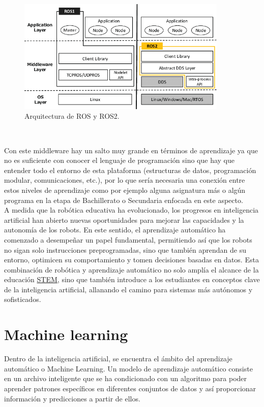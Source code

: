 \begin{figure} [h!]
  \begin{center}
    \includegraphics[width=10cm]{figs/ros.png}
  \end{center}
  \caption{Arquitectura de ROS y ROS2.}
  \label{fig:ros}
\end{figure}\

Con este middleware hay un salto muy grande en términos de aprendizaje ya que no es suficiente con conocer el lenguaje de programación sino que hay que entender todo el entorno de esta plataforma (estructuras de datos, programación modular, comunicaciones, etc.), por lo que sería necesaria una conexión entre estos niveles de aprendizaje como por ejemplo alguna asignatura más o algún programa en la etapa de Bachillerato o Secundaria enfocada en este aspecto.\\

A medida que la robótica educativa ha evolucionado, los progresos en inteligencia artificial han abierto nuevas oportunidades para mejorar las capacidades y la autonomía de los robots. En este sentido, el aprendizaje automático ha comenzado a desempeñar un papel fundamental, permitiendo así que los robots no sigan solo instrucciones preprogramadas, sino que también aprendan de su entorno, optimicen su comportamiento y tomen decisiones basadas en datos. Esta combinación de robótica y aprendizaje automático no solo amplía el alcance de la educación \hyperlink{STEM}{STEM}, sino que también introduce a los estudiantes en conceptos clave de la inteligencia artificial, allanando el camino para sistemas más autónomos y sofisticados.


\section{Machine learning}


Dentro de la inteligencia artificial, se encuentra el ámbito del aprendizaje automático o Machine Learning. Un modelo de aprendizaje automático consiste en un archivo inteligente que se ha condicionado con un algoritmo para poder aprender patrones específicos en diferentes conjuntos de datos y así proporcionar información y predicciones a partir de ellos.\\

